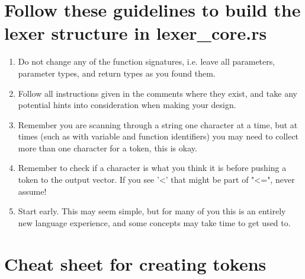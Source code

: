 \documentclass[
	12pt, %
]{fphw}
\begin{document}
\pagebreak

\section*{Follow these guidelines to build the lexer structure in lexer\_core.rs}

\begin{problem}
    \begin{enumerate}
        \item Do not change any of the function signatures, i.e. leave all parameters, parameter types, and return types as you found them.
        \item Follow all instructions given in the comments where they exist, and take any potential hints into consideration when making your design.
        \item Remember you are scanning through a string one character at a time, but at times (such as with variable and function identifiers) you may need to collect more than one character for a token, this is okay.
        \item Remember to check if a character is what you think it is before pushing a token to the output vector. If you see '<' that might be part of "<=", never assume!
        \item Start early. This may seem simple, but for many of you this is an entirely new language experience, and some concepts may take time to get used to.
        
    \end{enumerate}
\end{problem}

\section*{Cheat sheet for creating tokens}
\end{document}
